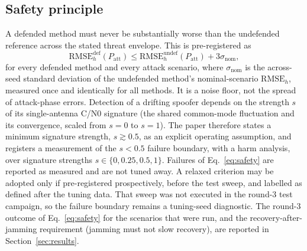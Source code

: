 \documentclass[journal]{IEEEtran}
\begin{document}
\subsection{Safety principle}
\label{sec:safety}
A defended method must never be substantially worse than the undefended reference across the stated threat
envelope. This is pre-registered as
\begin{equation}
\mathrm{RMSE}_h^{\mathrm{def}}(P_{\mathrm{att}}) \le \mathrm{RMSE}_h^{\mathrm{undef}}(P_{\mathrm{att}}) + 3\sigma_{\mathrm{nom}},
\label{eq:safety}
\end{equation}
for every defended method and every attack scenario, where $\sigma_{\mathrm{nom}}$ is the across-seed standard
deviation of the undefended method's nominal-scenario $\mathrm{RMSE}_h$, measured once and identically for
all methods. It is a noise floor, not the spread of attack-phase errors. Detection of a drifting spoofer
depends on the strength $s$ of its single-antenna C/N0 signature (the shared common-mode fluctuation and its
convergence, scaled from $s=0$ to $s=1$). The paper therefore states a minimum signature strength,
$s \gtrsim 0.5$, as an explicit operating assumption, and registers a measurement of the $s < 0.5$ failure boundary, with a harm
analysis, over signature strengths $s\in\{0,0.25,0.5,1\}$. Failures of
Eq.~\eqref{eq:safety} are reported as measured and are not tuned away. A relaxed criterion may be adopted
only if pre-registered prospectively, before the test sweep, and labelled as defined after the tuning data.
That sweep was not executed in the round-3 test campaign, so the failure boundary remains a tuning-seed diagnostic. The round-3 outcome of Eq.~\eqref{eq:safety} for the scenarios that were run, and the recovery-after-jamming requirement (jamming must not slow recovery), are reported in Section~\ref{sec:results}.

\end{document}
